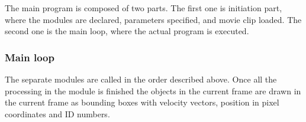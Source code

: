 The main program is composed of two parts. The first one is initiation part, where the modules are declared, parameters specified, and movie clip loaded. The second one is the main loop, where the actual program is executed.


\subsubsection{Main loop}
The separate modules are called in the order described above.
Once all the processing in the module is finished the objects in the current frame are drawn in the current frame as bounding boxes with velocity vectors, position in pixel coordinates and ID numbers.
